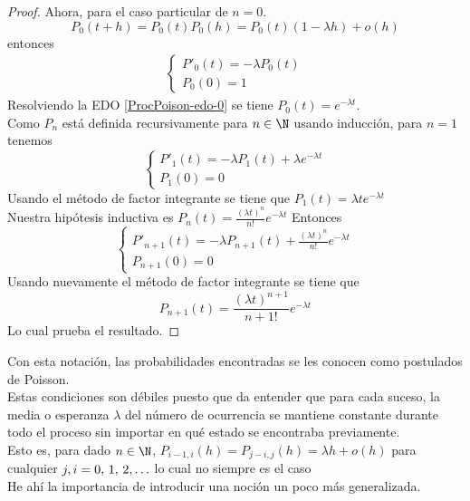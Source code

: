 \begin{proof}
        Ahora, para el caso particular de $n=0$.\\
        $$P_0(t+h)=P_0(t)P_0(h)=P_0(t)(1-\lambda h)+o(h)$$
        entonces
        \begin{eqnarray}
            \begin{cases}
                P'_0(t)=-\lambda P_0(t)\\
                P_0(0)=1
            \end{cases}
             \label{ProcPoison-edo-0}
        \end{eqnarray}
        Resolviendo la EDO \ref{ProcPoison-edo-0} se tiene $P_0(t)=e^{-\lambda t}$.\\
        Como $P_n$ está definida recursivamente para $n\in\N$ usando inducción,
        para $n=1$ tenemos 
        $$\begin{cases}
            P'_1(t)=-\lambda P_1(t)+\lambda e^{-\lambda t}\\
            P_1(0)=0
        \end{cases}$$
        Usando el método de factor integrante se tiene que $P_1(t)=\lambda te^{-\lambda t}$
        \\Nuestra hipótesis inductiva es 
        $P_n(t)=\frac{(\lambda t)^n}{n!}e^{-\lambda t}$
        Entonces 
        $$\begin{cases}
            P'_{n+1}(t)=-\lambda P_{n+1}(t)+\frac{(\lambda t)^n}{n!}e^{-\lambda t}\\
            P_{n+1}(0)=0
        \end{cases}$$
        Usando nuevamente el método de factor integrante se tiene que
        $$P_{n+1}(t)=\frac{(\lambda t)^{n+1}}{n+1!}e^{-\lambda t}$$
        Lo cual prueba el resultado.
    \end{proof}
    Con esta notación, las probabilidades encontradas se les conocen como postulados de Poisson.\\
    Estas condiciones son débiles puesto que da entender que para cada suceso, la media o esperanza $\lambda$ del número de ocurrencia se mantiene constante durante todo el proceso sin importar en qué estado se encontraba previamente.\\
    Esto es, para dado $n\in\N$,  $P_{i-1,i}(h)=P_{j-i,j}(h)=\lambda h + o(h)$ para cualquier $j,i=0,\thinspace 1,\thinspace 2 ,\ldots$ lo cual no siempre es el caso
    \\He ahí la importancia de introducir una noción un poco más generalizada.